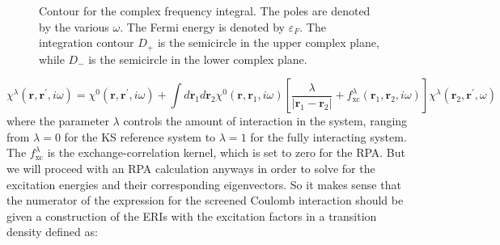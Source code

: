 \documentclass[12pt]{article}
\begin{document}
    \begin{figure}[h]
    \caption{Contour for the complex frequency integral. The poles are denoted by the various $\omega$. The Fermi energy is denoted by $\varepsilon_F$. The integration contour $D_+$ is the semicircle in the upper complex plane, while $D_-$ is the semicircle in the lower complex plane.}
    \label{fig:contour}
    \end{figure}
\begin{equation}\label{eq:dyson}
    \chi^{\lambda}\left(\mathbf{r}, \mathbf{r}^{\prime}, i \omega\right) = \chi^{0}\left(\mathbf{r}, \mathbf{r}^{\prime}, i \omega\right) 
    + \int d \mathbf{r}_{1} d \mathbf{r}_{2} \chi^{0}\left(\mathbf{r}, \mathbf{r}_{1}, i \omega\right)\left[\frac{\lambda}{\left|\mathbf{r}_{1}-\mathbf{r}_{2}\right|}+f_{\mathrm{xc}}^{\lambda}\left(\mathbf{r}_{1}, \mathbf{r}_{2}, i \omega\right)\right] \chi^{\lambda}\left(\mathbf{r}_{2}, \mathbf{r}^{\prime}, \omega\right)
\end{equation}
where the parameter $\lambda$ controls the amount of interaction in the system, ranging from $\lambda = 0$ for the KS reference system to $\lambda = 1$ for the fully interacting system. The $f_{\mathrm{xc}}^{\lambda}$ is the exchange-correlation kernel, which is set to zero for the RPA. But we will proceed with an RPA calculation anyways in order to solve for the excitation energies and their corresponding eigenvectors. So it makes sense that the numerator of the expression for the screened Coulomb interaction should be given a construction of the ERIs with the excitation factors in a transition density defined as:
\end{document}
